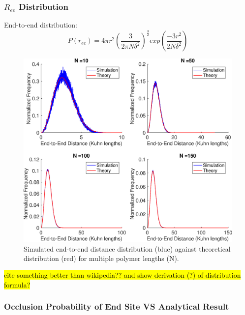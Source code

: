 \documentclass[../AdvancementSummary.tex]{subfiles}
\begin{document}
\subsubsection{$R_{ee}$ Distribution}

End-to-end distribution: \cite{VanValen2009}
\begin{equation*}
P(r_{ee}) = 4\pi r^2 \left( \frac{3}{2\pi N \delta^2}\right)^{\frac{3}{2}}exp\left(\frac{-3r^2}{2N \delta^2}\right)
\end{equation*}


\begin{figure}[H]
\begin{center}
\includegraphics[width=0.8\linewidth]{ModelConfirmationFigures/ReeDistribution.eps}
\caption{Simulated end-to-end distance distribution (blue) against theoretical distribution (red) for multiple polymer lengths (N). \label{fig: ReeDist}}
\end{center}
\end{figure}

\hl{ cite something better than wikipedia?? and show derivation (?) of distribution formula?}

\subsubsection{Occlusion Probability of End Site VS Analytical Result}




\end{document}
